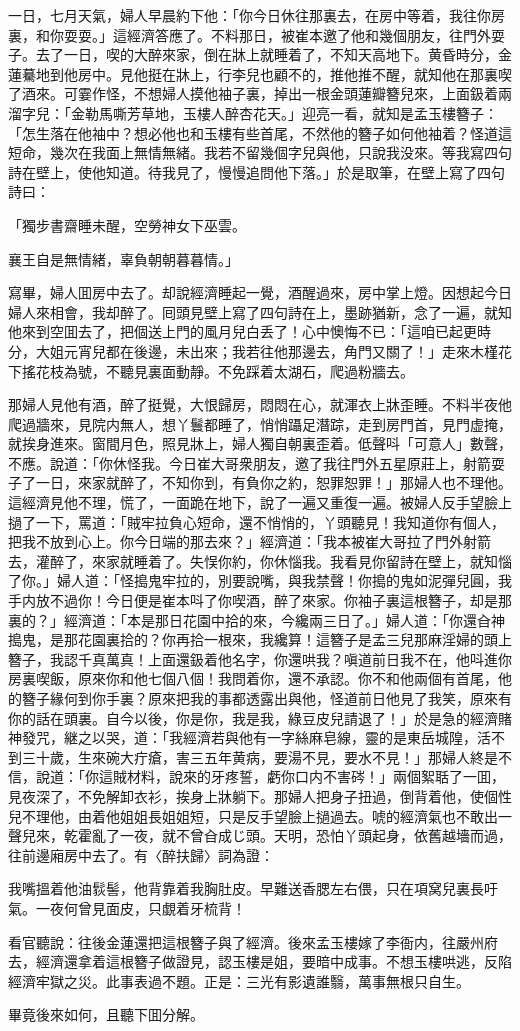 一日，七月天氣，婦人早晨約下他：「你今日休往那裏去，在房中等着，我往你房裏，和你耍耍。」這經濟答應了。不料那日，被崔本邀了他和幾個朋友，往門外耍子。去了一日，喫的大醉來家，倒在牀上就睡着了，不知天高地下。黄昏時分，金蓮驀地到他房中。見他挺在牀上，行李兒也顧不的，推他推不醒，就知他在那裏喫了酒來。可霎作怪，不想婦人摸他袖子裏，掉出一根金頭蓮瓣簪兒來，上面鈒着兩溜字兒：「金勒馬嘶芳草地，玉樓人醉杏花天。」迎亮一看，就知是孟玉樓簪子：「怎生落在他袖中？想必他也和玉樓有些首尾，不然他的簪子如何他袖着？怪道這短命，幾次在我面上無情無緒。我若不留幾個字兒與他，只說我没來。等我寫四句詩在壁上，使他知道。待我見了，慢慢追問他下落。」於是取筆，在壁上寫了四句詩曰：

\begin{myquote}
「獨步書齋睡未醒，空勞神女下巫雲。

襄王自是無情緒，辜負朝朝暮暮情。」
\end{myquote}

寫畢，婦人囬房中去了。却說經濟睡起一覺，酒醒過來，房中掌上燈。因想起今日婦人來相會，我却醉了。囘頭見壁上寫了四句詩在上，墨跡猶新，念了一遍，就知他來到空囬去了，把個送上門的風月兒白丢了！心中懊悔不已：「這咱已起更時分，大姐元宵兒都在後邊，未出來；我若往他那邊去，角門又關了！」走來木槿花下搖花枝為號，不聽見裏面動靜。不免踩着太湖石，爬過粉牆去。

那婦人見他有酒，醉了挺覺，大恨歸房，悶悶在心，就渾衣上牀歪睡。不料半夜他爬過牆來，見院内無人，想丫鬟都睡了，悄悄躡足潛踪，走到房門首，見門虚掩，就挨身進來。窗間月色，照見牀上，婦人獨自朝裏歪着。低聲呌「可意人」數聲，不應。說道：「你休怪我。今日崔大哥衆朋友，邀了我往門外五星原莊上，射箭耍子了一日，來家就醉了，不知你到，有負你之約，恕罪恕罪！」那婦人也不理他。這經濟見他不理，慌了，一面跪在地下，說了一遍又重復一遍。被婦人反手望臉上撾了一下，罵道：「賊牢拉負心短命，還不悄悄的，丫頭聽見！我知道你有個人，把我不放到心上。你今日端的那去來？」經濟道：「我本被崔大哥拉了門外射箭去，灌醉了，來家就睡着了。失悮你約，你休惱我。我看見你留詩在壁上，就知惱了你。」婦人道：「怪搗鬼牢拉的，別要說嘴，與我禁聲！你搗的鬼如泥彈兒圓，我手内放不過你！今日便是崔本呌了你喫酒，醉了來家。你袖子裏這根簪子，却是那裏的？」經濟道：「本是那日花園中拾的來，今纔兩三日了。」婦人道：「你還㒲神搗鬼，是那花園裏拾的？你再拾一根來，我纔算！這簪子是孟三兒那麻淫婦的頭上簪子，我認千真萬真！上面還鈒着他名字，你還哄我？嗔道前日我不在，他呌進你房裏喫飯，原來你和他七個八個！我問着你，還不承認。你不和他兩個有首尾，他的簪子緣何到你手裏？原來把我的事都透露出與他，怪道前日他見了我笑，原來有你的話在頭裏。自今以後，你是你，我是我，綠豆皮兒請退了！」於是急的經濟賭神發咒，継之以哭，道：「我經濟若與他有一字絲麻皂線，靈的是東岳城隍，活不到三十歲，生來碗大疔瘡，害三五年黄病，要湯不見，要水不見！」那婦人終是不信，說道：「你這賊材料，說來的牙疼誓，虧你口内不害硶！」兩個絮聒了一囬，見夜深了，不免解卸衣衫，挨身上牀躺下。那婦人把身子扭過，倒背着他，使個性兒不理他，由着他姐姐長姐姐短，只是反手望臉上撾過去。唬的經濟氣也不敢出一聲兒來，乾霍亂了一夜，就不曾㒲成じ頭。天明，恐怕丫頭起身，依舊越墻而過，往前邊廂房中去了。有〈醉扶歸〉詞為證：

\begin{myquote}
我嘴搵着他油䯼髻，他背靠着我胸肚皮。早難送香腮左右偎，只在項窝兒裏長吁氣。一夜何曾見面皮，只覷着牙梳背！
\end{myquote}

看官聽說：往後金蓮還把這根簪子與了經濟。後來孟玉樓嫁了李衙内，往嚴州府去，經濟還拿着這根簪子做證見，認玉樓是姐，要暗中成事。不想玉樓哄逃，反陷經濟牢獄之災。此事表過不題。正是：三光有影遺誰翳，萬事無根只自生。

畢竟後來如何，且聽下囬分解。

